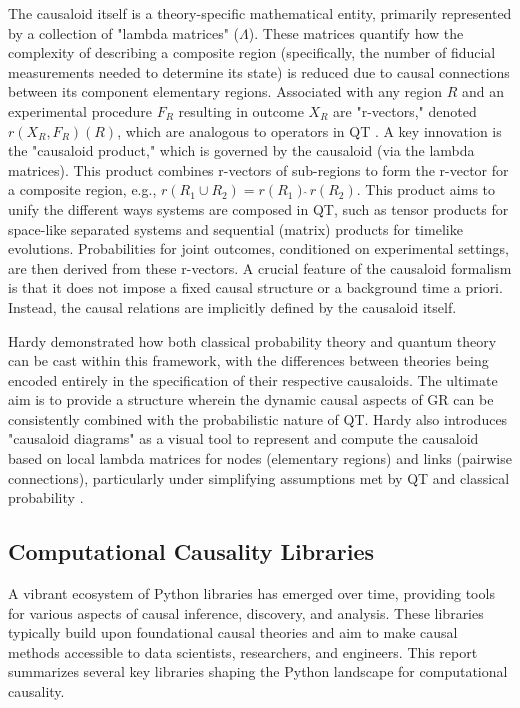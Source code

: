 {The causaloid itself is a theory-specific mathematical entity, primarily represented by a collection of "lambda matrices" ($\Lambda$). These matrices quantify how the complexity of describing a composite region (specifically, the number of fiducial measurements needed to determine its state) is reduced due to causal connections between its component elementary regions. Associated with any region $R$ and an experimental procedure $F_R$ resulting in outcome $X_R$ are "r-vectors," denoted $r(X_R, F_R)(R)$, which are analogous to operators in QT \cite{hardy2005probability}. A key innovation is the "causaloid product," which is governed by the causaloid (via the lambda matrices). This product combines r-vectors of sub-regions to form the r-vector for a composite region, e.g., $r(R_1 \cup R_2) = r(R_1) \hat{\;} r(R_2)$. This product aims to unify the different ways systems are composed in QT, such as tensor products for space-like separated systems and sequential (matrix) products for timelike evolutions. Probabilities for joint outcomes, conditioned on experimental settings, are then derived from these r-vectors. A crucial feature of the causaloid formalism is that it does not impose a fixed causal structure or a background time a priori. Instead, the causal relations are implicitly defined by the causaloid itself. 

Hardy demonstrated how both classical probability theory and quantum theory can be cast within this framework, with the differences between theories being encoded entirely in the specification of their respective causaloids. The ultimate aim is to provide a structure wherein the dynamic causal aspects of GR can be consistently combined with the probabilistic nature of QT. Hardy also introduces "causaloid diagrams" as a visual tool to represent and compute the causaloid based on local lambda matrices for nodes (elementary regions) and links (pairwise connections), particularly under simplifying assumptions met by QT and classical probability \cite{hardy2005probability}.

\newpage

\subsection{Computational Causality Libraries}

A vibrant ecosystem of Python libraries has emerged over time, providing tools for various aspects of causal inference, discovery, and analysis. These libraries typically build upon foundational causal theories and aim to make causal methods accessible to data scientists, researchers, and engineers. This report summarizes several key libraries shaping the Python landscape for computational causality.

}
